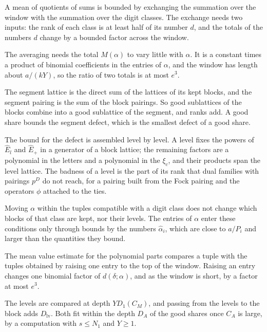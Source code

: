 A mean of quotients of sums is bounded by exchanging the summation over the window with the summation
over the digit classes. The exchange needs two inputs: the rank of each class is at least half of its
number $d$, and the totals of the numbers $d$ change by a bounded factor across the window.

The averaging needs the total $M(\alpha)$ to vary little with $\alpha$. It is a constant times a product of
binomial coefficients in the entries of $\alpha$, and the window has length about $a/(kY)$, so the ratio
of two totals is at most $e^3$.

The segment lattice is the direct sum of the lattices of its kept blocks, and the segment pairing is the
sum of the block pairings. So good sublattices of the blocks combine into a good sublattice of the
segment, and ranks add. A good share bounds the segment defect, which is the smallest defect of a good
share.

The bound for the defect is assembled level by level. A level fixes the powers of $\hat E_l$ and $\hat E_+$
in a generator of a block lattice; the remaining factors are a polynomial in the letters and a polynomial
in the $\xi_c$, and their products span the level lattice. The badness of a level is the part of its rank
that dual families with pairings $p^D$ do not reach, for a pairing built from the Fock pairing and the
operators $\phi$ attached to the ties.

Moving $\alpha$ within the tuples compatible with a digit class does not change which blocks of that
class are kept, nor their levels. The entries of $\alpha$ enter these conditions only through bounds by
the numbers $\hat\alpha_i$, which are close to $a/P_i$ and larger than the quantities they bound.

The mean value estimate for the polynomial parts compares a tuple with the tuples obtained by raising one
entry to the top of the window. Raising an entry changes one binomial factor of $d(\delta;\alpha)$, and as
the window is short, by a factor at most $e^3$.

The levels are compared at depth $YD_1(C_M)$, and passing from the levels to the block adds
$D_{\mathrm{lv}}$. Both fit within the depth $D_A$ of the good shares once $C_A$ is large, by a computation
with $s\leq N_1$ and $Y\geq1$.

